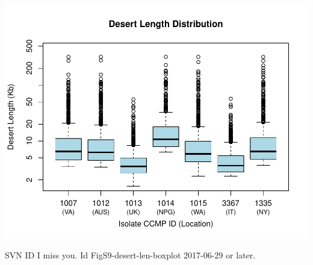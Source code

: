 \documentclass{article}\usepackage[]{graphicx}\usepackage[]{color}
\begin{document}
\includegraphics{FigS9-desert-len-boxplot-figs-mine/FigS9-desert-len-boxplot-fig.pdf}

\vfill\footnotesize\flushright SVN ID I miss you. $ $Id FigS9-desert-len-boxplot 2017-06-29 or later.$ $
\end{document}
